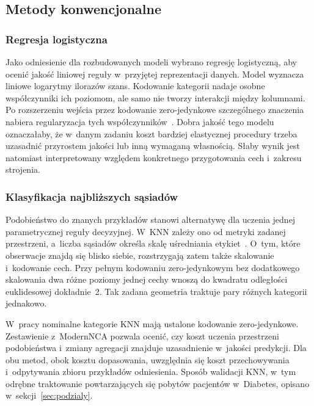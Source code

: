 \subsection{Metody konwencjonalne}
\label{sec:metody-konwencjonalne}

\subsubsection{Regresja logistyczna}
\label{sec:regresja-logistyczna}

Jako odniesienie dla rozbudowanych modeli wybrano regresję logistyczną, aby ocenić jakość liniowej reguły w~przyjętej reprezentacji danych. Model wyznacza liniowe logarytmy ilorazów szans. Kodowanie kategorii nadaje osobne współczynniki ich poziomom, ale samo nie tworzy interakcji między kolumnami. Po rozszerzeniu wejścia przez kodowanie zero-jedynkowe szczególnego znaczenia nabiera regularyzacja tych współczynników~\cite{sklearnLogistic}. Dobra jakość tego modelu oznaczałaby, że w~danym zadaniu koszt bardziej elastycznej procedury trzeba uzasadnić przyrostem jakości lub inną wymaganą własnością. Słaby wynik jest natomiast interpretowany względem konkretnego przygotowania cech i~zakresu strojenia.

\subsubsection{Klasyfikacja najbliższych sąsiadów}
\label{sec:knn}

Podobieństwo do znanych przykładów stanowi alternatywę dla uczenia jednej parametrycznej reguły decyzyjnej. W~KNN zależy ono od metryki zadanej przestrzeni, a~liczba sąsiadów określa skalę uśredniania etykiet~\cite{cover1967nearest,sklearnNeighbors}. O~tym, które obserwacje znajdą się blisko siebie, rozstrzygają zatem także skalowanie i~kodowanie cech. Przy pełnym kodowaniu zero-jedynkowym bez dodatkowego skalowania dwa różne poziomy jednej cechy wnoszą do kwadratu odległości euklidesowej dokładnie~2. Tak zadana geometria traktuje pary różnych kategorii jednakowo.

W~pracy nominalne kategorie KNN mają ustalone kodowanie zero-jedynkowe. Zestawienie z~ModernNCA pozwala ocenić, czy koszt uczenia przestrzeni podobieństwa i~zmiany agregacji znajduje uzasadnienie w~jakości predykcji. Dla obu metod, obok kosztu dopasowania, uwzględnia się koszt przechowywania i~odpytywania zbioru przykładów odniesienia. Sposób walidacji KNN, w~tym odrębne traktowanie powtarzających się pobytów pacjentów w~Diabetes, opisano w~sekcji~\ref{sec:podzialy}.

